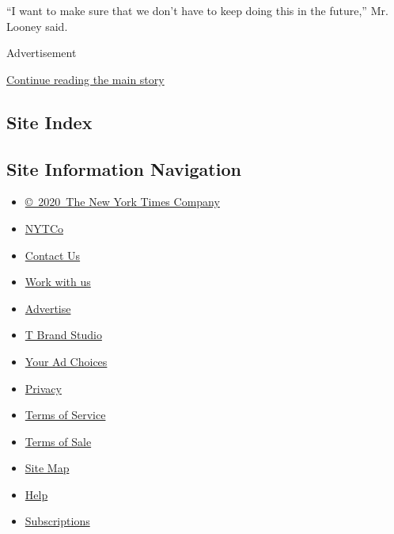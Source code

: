 ``I want to make sure that we don't have to keep doing this in the
future,'' Mr. Looney said.

Advertisement

\protect\hyperlink{after-bottom}{Continue reading the main story}

\hypertarget{site-index}{%
\subsection{Site Index}\label{site-index}}

\hypertarget{site-information-navigation}{%
\subsection{Site Information
Navigation}\label{site-information-navigation}}

\begin{itemize}
\tightlist
\item
  \href{https://help.nytimes.com/hc/en-us/articles/115014792127-Copyright-notice}{©~2020~The
  New York Times Company}
\end{itemize}

\begin{itemize}
\tightlist
\item
  \href{https://www.nytco.com/}{NYTCo}
\item
  \href{https://help.nytimes.com/hc/en-us/articles/115015385887-Contact-Us}{Contact
  Us}
\item
  \href{https://www.nytco.com/careers/}{Work with us}
\item
  \href{https://nytmediakit.com/}{Advertise}
\item
  \href{http://www.tbrandstudio.com/}{T Brand Studio}
\item
  \href{https://www.nytimes.com/privacy/cookie-policy\#how-do-i-manage-trackers}{Your
  Ad Choices}
\item
  \href{https://www.nytimes.com/privacy}{Privacy}
\item
  \href{https://help.nytimes.com/hc/en-us/articles/115014893428-Terms-of-service}{Terms
  of Service}
\item
  \href{https://help.nytimes.com/hc/en-us/articles/115014893968-Terms-of-sale}{Terms
  of Sale}
\item
  \href{https://spiderbites.nytimes.com}{Site Map}
\item
  \href{https://help.nytimes.com/hc/en-us}{Help}
\item
  \href{https://www.nytimes.com/subscription?campaignId=37WXW}{Subscriptions}
\end{itemize}
